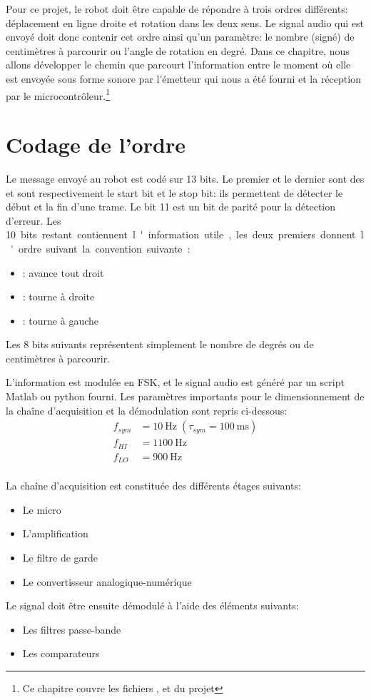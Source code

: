 Pour ce projet, le robot doit être capable de répondre à trois ordres différents: déplacement en ligne droite et rotation dans les deux sens. Le signal audio qui est envoyé doit donc contenir cet ordre ainsi qu'un paramètre: le nombre (signé) de centimètres à parcourir ou l'angle de rotation en degré. Dans ce chapitre, nous allons développer le chemin que parcourt l'information entre le moment où elle est envoyée sous forme sonore par l'émetteur qui nous a été fourni et la réception par le microcontrôleur.\footnote{Ce chapitre couvre les fichiers ,  et  du projet }

\section{Codage de l'ordre}
Le message envoyé au robot est codé sur 13 bits. Le premier et le dernier sont des  et sont respectivement le start bit et le stop bit: ils permettent de détecter le début et la fin d'une trame. Le bit 11 est un bit de parité pour la détection d'erreur. Les \SI{10} bits restant contiennent l'information utile, les deux premiers donnent l'ordre suivant la convention suivante:
\begin{itemize}
\item {}: avance tout droit
\item {}: tourne à droite
\item {}: tourne à gauche
\end{itemize}
Les 8 bits suivants représentent simplement le nombre de degrés ou de centimètres à parcourir.

L'information est modulée en FSK, et le signal audio est généré par un script Matlab ou python fourni. Les paramètres importants pour le dimensionnement de la chaîne d'acquisition et la démodulation sont repris ci-dessous:
\begin{align*}
f_{sym} &= \SI{10}{\hertz} \;(\tau_{sym} = \SI{100}{\milli\second})\\
f_{HI} &= \SI{1100}{\hertz}\\
f_{LO} &= \SI{900}{\hertz}\\
\end{align*}

La chaîne d'acquisition est constituée des différents étages suivants:
\begin{itemize}
\item Le micro
\item L'amplification
\item Le filtre de garde
\item Le convertisseur analogique-numérique
\end{itemize}
Le signal doit être ensuite démodulé à l'aide des éléments suivants:
\begin{itemize}
\item Les filtres passe-bande
\item Les comparateurs
\end{itemize}

